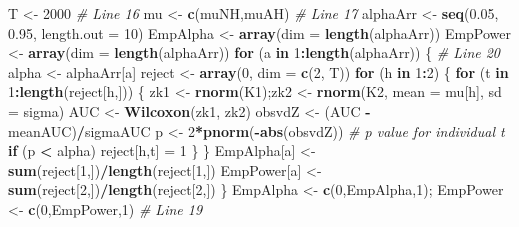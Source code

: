 \documentclass[
]{book}
\newenvironment{Shaded}{\begin{snugshade}}{\end{snugshade}}
\newcommand{\CommentTok}[1]{\textcolor[rgb]{0.56,0.35,0.01}{\textit{#1}}}
\newcommand{\ControlFlowTok}[1]{\textcolor[rgb]{0.13,0.29,0.53}{\textbf{#1}}}
\newcommand{\DataTypeTok}[1]{\textcolor[rgb]{0.13,0.29,0.53}{#1}}
\newcommand{\DecValTok}[1]{\textcolor[rgb]{0.00,0.00,0.81}{#1}}
\newcommand{\FloatTok}[1]{\textcolor[rgb]{0.00,0.00,0.81}{#1}}
\newcommand{\KeywordTok}[1]{\textcolor[rgb]{0.13,0.29,0.53}{\textbf{#1}}}
\newcommand{\NormalTok}[1]{#1}
\newcommand{\OperatorTok}[1]{\textcolor[rgb]{0.81,0.36,0.00}{\textbf{#1}}}
\newcommand{\StringTok}[1]{\textcolor[rgb]{0.31,0.60,0.02}{#1}}
\begin{document}
\begin{Shaded}
\begin{Highlighting}[]
\NormalTok{T <-}\StringTok{ }\DecValTok{2000}  \CommentTok{# Line 16}
\NormalTok{mu <-}\StringTok{ }\KeywordTok{c}\NormalTok{(muNH,muAH) }\CommentTok{# Line 17}
\NormalTok{alphaArr <-}\StringTok{ }\KeywordTok{seq}\NormalTok{(}\FloatTok{0.05}\NormalTok{, }\FloatTok{0.95}\NormalTok{, }\DataTypeTok{length.out =} \DecValTok{10}\NormalTok{)}
\NormalTok{EmpAlpha <-}\StringTok{ }\KeywordTok{array}\NormalTok{(}\DataTypeTok{dim =} \KeywordTok{length}\NormalTok{(alphaArr))}
\NormalTok{EmpPower <-}\StringTok{ }\KeywordTok{array}\NormalTok{(}\DataTypeTok{dim =} \KeywordTok{length}\NormalTok{(alphaArr))}
\ControlFlowTok{for}\NormalTok{ (a }\ControlFlowTok{in} \DecValTok{1}\OperatorTok{:}\KeywordTok{length}\NormalTok{(alphaArr)) \{ }\CommentTok{# Line 20}
\NormalTok{  alpha <-}\StringTok{ }\NormalTok{alphaArr[a] }
\NormalTok{  reject <-}\StringTok{ }\KeywordTok{array}\NormalTok{(}\DecValTok{0}\NormalTok{, }\DataTypeTok{dim =} \KeywordTok{c}\NormalTok{(}\DecValTok{2}\NormalTok{, T))}
  \ControlFlowTok{for}\NormalTok{ (h }\ControlFlowTok{in} \DecValTok{1}\OperatorTok{:}\DecValTok{2}\NormalTok{) \{  }
    \ControlFlowTok{for}\NormalTok{ (t }\ControlFlowTok{in} \DecValTok{1}\OperatorTok{:}\KeywordTok{length}\NormalTok{(reject[h,])) \{  }
\NormalTok{      zk1 <-}\StringTok{ }\KeywordTok{rnorm}\NormalTok{(K1);zk2 <-}\StringTok{ }\KeywordTok{rnorm}\NormalTok{(K2, }\DataTypeTok{mean =}\NormalTok{ mu[h], }\DataTypeTok{sd =}\NormalTok{ sigma)  }
\NormalTok{      AUC <-}\StringTok{ }\KeywordTok{Wilcoxon}\NormalTok{(zk1, zk2)  }
\NormalTok{      obsvdZ <-}\StringTok{ }\NormalTok{(AUC }\OperatorTok{-}\StringTok{ }\NormalTok{meanAUC)}\OperatorTok{/}\NormalTok{sigmaAUC}
\NormalTok{      p <-}\StringTok{ }\DecValTok{2}\OperatorTok{*}\KeywordTok{pnorm}\NormalTok{(}\OperatorTok{-}\KeywordTok{abs}\NormalTok{(obsvdZ)) }\CommentTok{# p value for individual t}
      \ControlFlowTok{if}\NormalTok{ (p }\OperatorTok{<}\StringTok{ }\NormalTok{alpha) reject[h,t] =}\StringTok{ }\DecValTok{1} 
\NormalTok{    \}}
\NormalTok{  \}}
\NormalTok{  EmpAlpha[a] <-}\StringTok{ }\KeywordTok{sum}\NormalTok{(reject[}\DecValTok{1}\NormalTok{,])}\OperatorTok{/}\KeywordTok{length}\NormalTok{(reject[}\DecValTok{1}\NormalTok{,])}
\NormalTok{  EmpPower[a] <-}\StringTok{ }\KeywordTok{sum}\NormalTok{(reject[}\DecValTok{2}\NormalTok{,])}\OperatorTok{/}\KeywordTok{length}\NormalTok{(reject[}\DecValTok{2}\NormalTok{,])}
\NormalTok{\}}
\NormalTok{EmpAlpha <-}\StringTok{ }\KeywordTok{c}\NormalTok{(}\DecValTok{0}\NormalTok{,EmpAlpha,}\DecValTok{1}\NormalTok{); EmpPower <-}\StringTok{ }\KeywordTok{c}\NormalTok{(}\DecValTok{0}\NormalTok{,EmpPower,}\DecValTok{1}\NormalTok{) }\CommentTok{# Line 19}


\end{Highlighting}
\end{Shaded}
\end{document}
